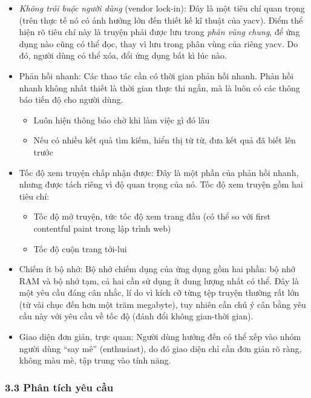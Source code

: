 \documentclass[
]{article}
\begin{document}
\begin{itemize}
\item
  \emph{Không trói buộc người dùng} (vendor lock-in): Đây là một tiêu
  chí quan trọng (trên thực tế nó có ảnh hưởng lớn đến thiết kế kĩ thuật
  của yacv). Điểm thể hiện rõ tiêu chí này là truyện phải được lưu trong
  \emph{phân vùng chung}, để ứng dụng nào cũng có thể đọc, thay vì lưu
  trong phân vùng của riêng yacv. Do đó, người dùng có thể xóa, đổi ứng
  dụng bất kì lúc nào.
\item
  Phản hồi nhanh: Các thao tác cần có thời gian phản hồi nhanh. Phản hồi
  nhanh không nhất thiết là thời gian thực thi ngắn, mà là luôn có các
  thông báo tiến độ cho người dùng.

  \begin{itemize}
    \item
    Luôn hiện thông báo chờ khi làm việc gì đó lâu
  \item
    Nếu có nhiều kết quả tìm kiếm, hiển thị từ từ, đưa kết quả đã biết
    lên trước
  \end{itemize}
\item
  Tốc độ xem truyện chấp nhận được: Đây là một phần của phản hồi nhanh,
  nhưng được tách riêng vì độ quan trọng của nó. Tốc độ xem truyện gồm
  hai tiêu chí:

  \begin{itemize}
    \item
    Tốc độ mở truyện, tức tốc độ xem trang đầu (có thể so với first
    contentful paint trong lập trình web)
  \item
    Tốc độ cuộn trang tới-lui
  \end{itemize}
\item
  Chiếm ít bộ nhớ: Bộ nhớ chiếm dụng của ứng dụng gồm hai phần: bộ nhớ
  RAM và bộ nhớ tạm, cả hai cần sử dụng ít dung lượng nhất có thể. Đây
  là một yêu cầu đáng cân nhắc, lí do vì kích cỡ từng tệp truyện thường
  rất lớn (từ vài chục đến hơn một trăm megabyte), tuy nhiên cần chú ý
  cân bằng yêu cầu này với yêu cầu về tốc độ (đánh đổi không gian-thời
  gian).
\item
  Giao diện đơn giản, trực quan: Người dùng hướng đến có thể xếp vào
  nhóm người dùng ``say mê'' (enthusiast), do đó giao diện chỉ cần đơn
  giản rõ ràng, không màu mè, tập trung vào tính năng.
\end{itemize}

\hypertarget{phuxe2n-tuxedch-yuxeau-cux1ea7u}{%
\subsubsection{\texorpdfstring{3.3 Phân tích yêu cầu
}{3.3 Phân tích yêu cầu }}\label{phuxe2n-tuxedch-yuxeau-cux1ea7u}}
\end{document}
